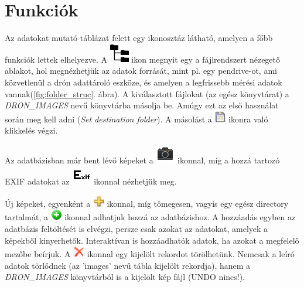 \documentclass[a4paper,12pt]{book}
\begin{document}
\section{Funkciók}

Az adatokat mutató táblázat felett egy ikonosztáz látható, amelyen a főbb funkciók lettek elhelyezve. A \includegraphics[width = 0.5 cm]{filesystem.png} ikon megnyit egy a fájlrendszert nézegető ablakot, hol megnézhetjük az adatok forrását, mint pl. egy pendrive-ot, ami közvetlenül a drón adattároló eszköze, és amelyen a legfrissebb mérési adatok vannak(\ref{fig:folder_struc}. ábra). A kiválasztott fájlokat (az egész könyvtárat) a \textit{DRON\_IMAGES} nevű könyvtárba másolja be. Amúgy ezt az első használat során meg kell adni (\textit{Set destination folder}). A másolást a \includegraphics[width=0.5cm]{save.png} ikonra való klikkelés végzi.

Az adatbázisban már bent lévő képeket a \includegraphics[width = 0.5 cm]{camera.png}  ikonnal, míg a hozzá tartozó EXIF adatokat az \includegraphics[width = 0.5 cm]{exif.png}  ikonnal nézhetjük meg.

Új képeket, egyenként a \includegraphics[width=0.5cm]{plus.png} ikonnal, míg tömegesen, vagyis egy egész directory tartalmát, a \includegraphics[width=0.5cm]{addfolder.png} ikonnal adhatjuk hozzá az adatbázishoz. A hozzáadás egyben az adatbázis feltöltését is elvégzi, persze csak azokat az adatokat, amelyek a képekből kinyerhetők. Interaktívan is hozzáadhatók adatok, ha azokat a megfelelő mezőbe beírjuk. A \includegraphics[width=0.5cm]{del.png} ikonnal egy kijelölt rekordot törölhetünk. Nemcsak a leíró adatok törlődnek (az 'images' nevű tábla kijelölt rekordja), hanem a \textit{DRON\_IMAGES} könyvtárból is a kijelölt kép fájl (UNDO nincs!).
\end{document}
